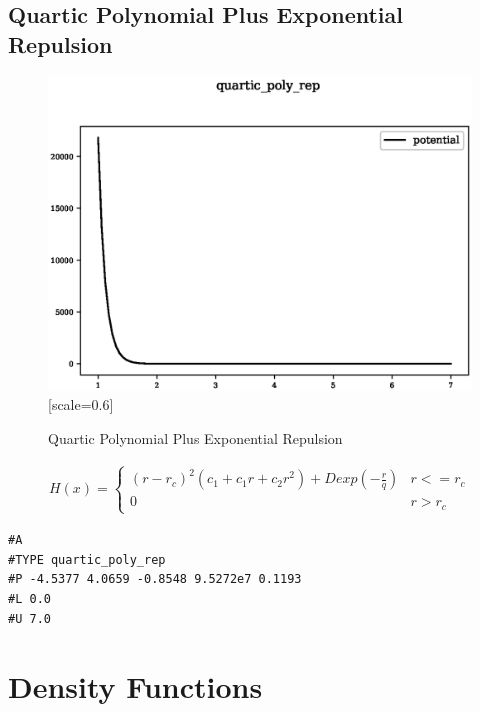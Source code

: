 \documentclass[12pt,twoside]{manual}
\begin{document}
\begin{appendices}
\subsection{Quartic Polynomial Plus Exponential Repulsion}

\begin{figure}[h]
  \begin{center}
    \includegraphics{img/plots/quartic_poly_rep.eps}[scale=0.6]
    \caption{Quartic Polynomial Plus Exponential Repulsion}
    \label{graph:graph1}
  \end{center}
\end{figure}

\begin{equation}
\begin{split}
H(x) = \left\{ \begin{matrix} (r - r_c)^2 (c_1 + c_1 r + c_2 r^2) + D exp(- \frac{r}{q}) & r <= r_c \\  0 & r > r_c \end{matrix} \right . 
\end{split}
\label{eq:simpleSpline}
\end{equation}

\begin{lstlisting}[style=pseudocode,caption={Quartic Polynomial with Repulsive Term}]
#A
#TYPE quartic_poly_rep
#P -4.5377 4.0659 -0.8548 9.5272e7 0.1193
#L 0.0
#U 7.0
\end{lstlisting}







\section{Density Functions}


\end{appendices}
\end{document}

